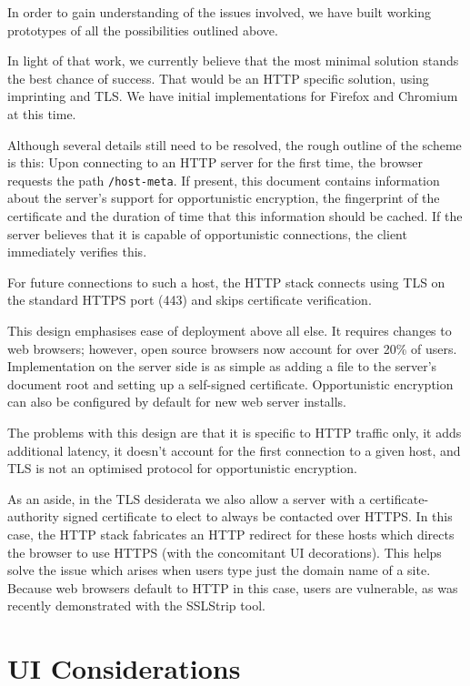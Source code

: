 \documentclass[conference]{IEEEtran}
\begin{document}
In order to gain understanding of the issues involved, we have built working
prototypes of all the possibilities outlined above.

In light of that work, we currently believe that the most minimal solution
stands the best chance of success. That would be an HTTP specific solution,
using imprinting and TLS. We have initial implementations for Firefox and
Chromium at this time.

Although several details still need to be resolved, the rough
outline of the scheme is this: Upon connecting to an HTTP server for the first
time, the browser requests the path {\tt /host-meta}. If present,
this document\cite{hostmeta} contains information about the server's support for
opportunistic encryption, the fingerprint of the certificate and the duration of
time that this information should be cached. If the server believes that it
is capable of opportunistic connections, the client immediately verifies this.

For future connections to such a host, the HTTP stack connects using TLS on the
standard HTTPS port (443) and skips certificate verification.

This design emphasises ease of deployment above all else. It requires changes to
web browsers; however, open source browsers now account for over 20\% of
users\cite{netapp}. Implementation on the server side is as simple as adding a
file to the server's document root and setting up a self-signed certificate.
Opportunistic encryption can also be configured by default for new web server
installs.

The problems with this design are that it is specific to HTTP traffic only, it
adds additional latency, it doesn't account for the first connection to a given
host, and TLS is not an optimised protocol for opportunistic encryption.

As an aside, in the TLS desiderata we also allow a server with a
certificate-authority signed certificate to elect to always be contacted over
HTTPS. In this case, the HTTP stack fabricates an HTTP redirect for these hosts
which directs the browser to use HTTPS (with the concomitant UI decorations).
This helps solve the issue which arises when users type just the domain name of
a site. Because web browsers default to HTTP in this case, users are vulnerable, as was recently demonstrated with the SSLStrip tool\cite{sslstrip}.

\section{UI Considerations}
\end{document}

